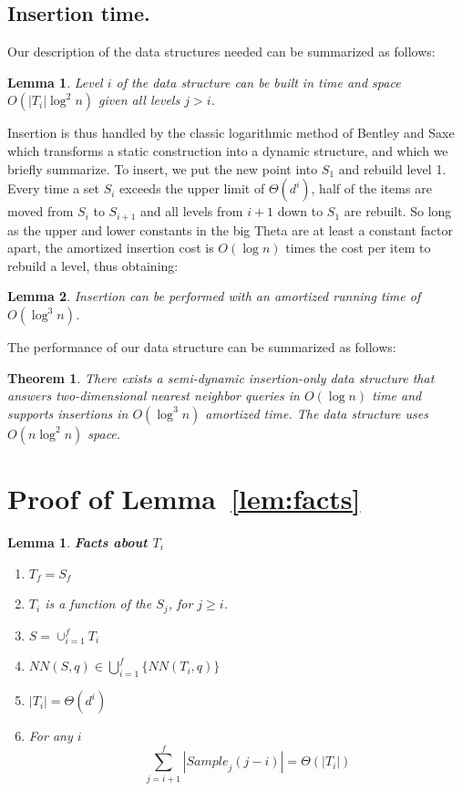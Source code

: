 \documentclass[10pt,a4paper]{amsart}
\newcommand{\Sample}{\mathit{Sample}}
\newcommand{\NN}{\mathit{NN}}
\newtheorem{theorem}{Theorem}
\newtheorem{lemma}{Lemma}
\begin{document}
\subsection{Insertion time.} \label{sec:insert}

Our description of the data structures needed can be summarized as follows:

\begin{lemma}
    Level $i$ of the data structure can be built in time and space $O(|T_i| \log^2 n)$ given all levels $j>i$.
\end{lemma}

Insertion is thus handled by the classic 
logarithmic method of Bentley and Saxe~\cite{BentleyS80} which transforms a static construction into a dynamic structure, and which we briefly summarize. To insert, we put the new point into $S_1$ and rebuild level 1. Every time a set $S_i$ exceeds the upper limit of $\Theta(d^i)$, half of the items are moved from $S_i$ to $S_{i+1}$ and all levels from $i+1$ down to $S_1$ are rebuilt. So long as the upper and lower constants in the big Theta are at least a constant factor apart, the amortized insertion cost is $O(\log n)$ times the cost per item to rebuild a level, thus obtaining:

\begin{lemma}
    Insertion can be performed with an amortized running time of $O(\log^3 n)$.
\end{lemma}
The performance of our data structure can be summarized as follows:
\begin{theorem}
  \label{theor:semidyn1}
  There exists a semi-dynamic insertion-only data structure that answers two-dimensional nearest neighbor queries in $O(\log n)$ time and supports insertions  in $O(\log^3 n)$ amortized time.  The data structure uses $O(n \log^2 n)$ space. 
\end{theorem}






\appendix

\newtheorem{restatedlemma}{Lemma}

\section{Proof of Lemma~\ref{lem:facts}}
\label{sec:lemma1}
\begin{restatedlemma}{\bf Facts about $T_i$}  
	\begin{enumerate}
 \setlength{\itemsep}{1pt}
\setlength{\parskip}{0pt}
\setlength{\parsep}{0pt} 
    \item $T_{f}=S_{f}$
    \item $T_i$ is a function of the $S_j$, for $j \geq i$.
    \item $S=\cup_{i=1}^{f} T_i$
    \item $\NN(S,q) \in \bigcup_{i=1}^f \{ \NN(T_i,q)\} $
    \item $|T_i| = \Theta(d^i)$
    \item For any $i$
	$$ \sum_{j=i+1}^f |\Sample_j(j-i)|=\Theta(|T_i|)$$
\end{enumerate}
\end{restatedlemma}
\end{document}
